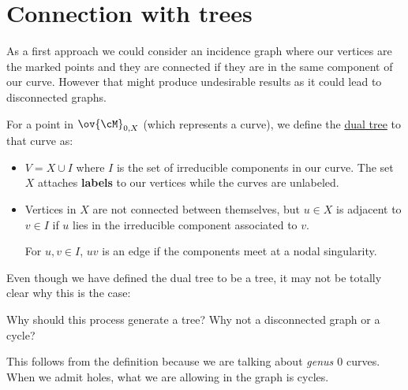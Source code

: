 \documentclass[12pt]{memoir}
\begin{document}
    \section{Connection with trees}
    
    As a first approach we could consider an incidence graph where our vertices are the marked points and they are connected if they are in the same component of our curve. However that might produce undesirable results as it could lead to disconnected graphs.
    
    \begin{Def}
    For a point in $\ov{\cM}_{0,X}$ (which represents a curve), we define the \underline{dual tree} to that curve as:
    \begin{itemize}
        \item $V=X\cup I$ where $I$ is the set of irreducible components in our curve. The set $X$ attaches \textbf{labels} to our vertices while the curves are unlabeled.
        \item Vertices in $X$ are not connected between themselves, but $u\in X$ is adjacent to $v\in I$ if $u$ lies in the irreducible component associated to $v$.\par 
        For $u,v\in I$, $uv$ is an edge if the components meet at a nodal singularity.
    \end{itemize}
    \end{Def}
    
    Even though we have defined the dual tree to be a tree, it may not be totally clear why this is the case: %
    \begin{significant}
        Why should this process generate a tree? Why not a disconnected graph or a cycle?
    \end{significant}
    This follows from the definition because we are talking about \emph{genus $0$} curves. When we admit holes, what we are allowing in the graph is cycles.
    
\end{document}
